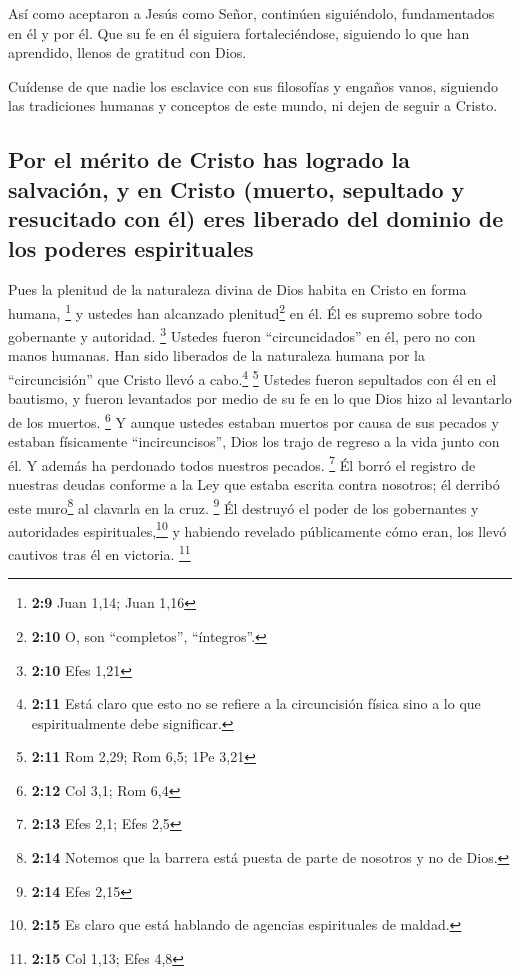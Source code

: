  Así como aceptaron a Jesús como Señor, continúen
siguiéndolo,  fundamentados en él y por él. Que su fe en
él siguiera fortaleciéndose, siguiendo lo que han aprendido, llenos de
gratitud con Dios.

 Cuídense de que nadie los esclavice con sus filosofías y
engaños vanos, siguiendo las tradiciones humanas y conceptos de este
mundo, ni dejen de seguir a Cristo.

\hypertarget{por-el-muxe9rito-de-cristo-has-logrado-la-salvaciuxf3n-y-en-cristo-muerto-sepultado-y-resucitado-con-uxe9l-eres-liberado-del-dominio-de-los-poderes-espirituales}{%
\subsection{Por el mérito de Cristo has logrado la salvación, y en
Cristo (muerto, sepultado y resucitado con él) eres liberado del dominio
de los poderes
espirituales}\label{por-el-muxe9rito-de-cristo-has-logrado-la-salvaciuxf3n-y-en-cristo-muerto-sepultado-y-resucitado-con-uxe9l-eres-liberado-del-dominio-de-los-poderes-espirituales}}

 Pues la plenitud de la naturaleza divina de Dios habita
en Cristo en forma humana, \footnote{\textbf{2:9} Juan 1,14; Juan 1,16}
 y ustedes han alcanzado plenitud\footnote{\textbf{2:10}
  O, son ``completos'', ``íntegros''.} en él. Él es supremo sobre todo
gobernante y autoridad. \footnote{\textbf{2:10} Efes 1,21}
 Ustedes fueron ``circuncidados'' en él, pero no con
manos humanas. Han sido liberados de la naturaleza humana por la
``circuncisión'' que Cristo llevó a cabo.\footnote{\textbf{2:11} Está
  claro que esto no se refiere a la circuncisión física sino a lo que
  espiritualmente debe significar.} \footnote{\textbf{2:11} Rom 2,29;
  Rom 6,5; 1Pe 3,21}  Ustedes fueron sepultados con él en
el bautismo, y fueron levantados por medio de su fe en lo que Dios hizo
al levantarlo de los muertos. \footnote{\textbf{2:12} Col 3,1; Rom 6,4}
 Y aunque ustedes estaban muertos por causa de sus
pecados y estaban físicamente ``incircuncisos'', Dios los trajo de
regreso a la vida junto con él. Y además ha perdonado todos nuestros
pecados. \footnote{\textbf{2:13} Efes 2,1; Efes 2,5}  Él
borró el registro de nuestras deudas conforme a la Ley que estaba
escrita contra nosotros; él derribó este muro\footnote{\textbf{2:14}
  Notemos que la barrera está puesta de parte de nosotros y no de Dios.}
al clavarla en la cruz. \footnote{\textbf{2:14} Efes 2,15}
 Él destruyó el poder de los gobernantes y autoridades
espirituales,\footnote{\textbf{2:15} Es claro que está hablando de
  agencias espirituales de maldad.} y habiendo revelado públicamente
cómo eran, los llevó cautivos tras él en victoria. \footnote{\textbf{2:15}
  Col 1,13; Efes 4,8}

